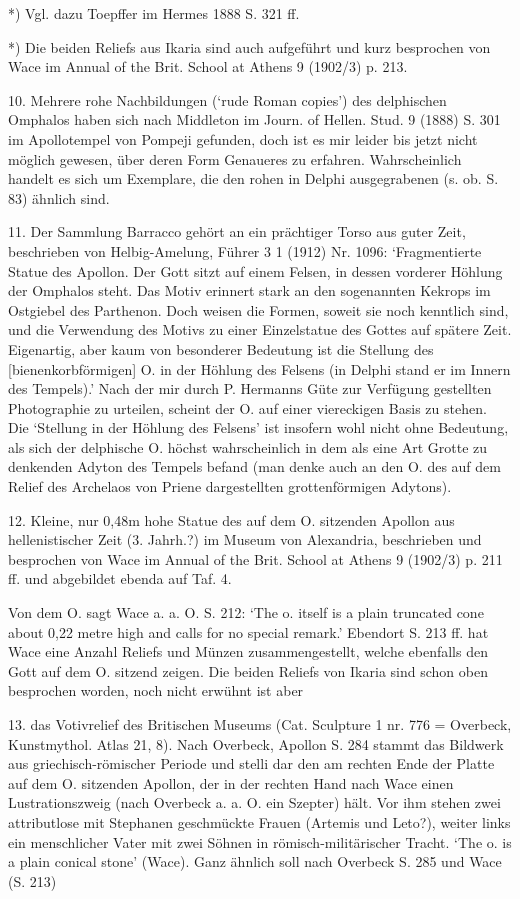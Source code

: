 \documentclass[a4paper, 11pt, oneside]{article}
\begin{document}
*) Vgl. dazu Toepffer im Hermes 1888 S. 321 ff.

*) Die beiden Reliefs aus Ikaria sind auch aufgeführt und kurz besprochen von Wace im Annual of the Brit. School at Athens 9 (1902/3) p. 213.

10. Mehrere rohe Nachbildungen (`rude Roman copies') des delphischen Omphalos haben sich nach Middleton im Journ. of Hellen. Stud. 9 (1888) S. 301 im Apollotempel von Pompeji gefunden, doch ist es mir leider bis jetzt nicht möglich gewesen, über deren Form Genaueres zu erfahren. Wahrscheinlich handelt es sich um Exemplare, die den rohen in Delphi ausgegrabenen (s. ob. S. 83) ähnlich sind.

11. Der Sammlung Barracco gehört an ein prächtiger Torso aus guter Zeit, beschrieben von Helbig-Amelung, Führer 3 1 (1912) Nr. 1096: `Fragmentierte Statue des Apollon. Der Gott sitzt auf einem Felsen, in dessen vorderer Höhlung der Omphalos steht. Das Motiv erinnert stark an den sogenannten Kekrops im Ostgiebel des Parthenon. Doch weisen die Formen, soweit sie noch kenntlich sind, und die Verwendung des Motivs zu einer Einzelstatue des Gottes auf spätere Zeit. Eigenartig, aber kaum von besonderer Bedeutung ist die Stellung des [bienenkorbförmigen] O. in der Höhlung des Felsens (in Delphi stand er im Innern des Tempels).' Nach der mir durch P. Hermanns Güte zur Verfügung gestellten Photographie zu urteilen, scheint der O. auf einer viereckigen Basis zu stehen. Die `Stellung in der Höhlung des Felsens' ist insofern wohl nicht ohne Bedeutung, als sich der delphische O. höchst wahrscheinlich in dem als eine Art Grotte zu denkenden Adyton des Tempels befand (man denke auch an den O. des auf dem Relief des Archelaos von Priene dargestellten grottenförmigen Adytons).

12. Kleine, nur 0,48m hohe Statue des auf dem O. sitzenden Apollon aus hellenistischer Zeit (3. Jahrh.?) im Museum von Alexandria, beschrieben und besprochen von Wace im Annual of the Brit. School at Athens 9 (1902/3) p. 211 ff. und abgebildet ebenda auf Taf. 4.

Von dem O. sagt Wace a. a. O. S. 212: `The o. itself is a plain truncated cone about 0,22 metre high and calls for no special remark.' Ebendort S. 213 ff. hat Wace eine Anzahl Reliefs und Münzen zusammengestellt, welche ebenfalls den Gott auf dem O. sitzend zeigen. Die beiden Reliefs von Ikaria sind schon oben besprochen worden, noch nicht erwühnt ist aber

13. das Votivrelief des Britischen Museums (Cat. Sculpture 1 nr. 776 = Overbeck, Kunstmythol. Atlas 21, 8). Nach Overbeck, Apollon S. 284 stammt das Bildwerk aus griechisch-römischer Periode und stelli dar den am rechten Ende der Platte auf dem O. sitzenden Apollon, der in der rechten Hand nach Wace einen Lustrationszweig (nach Overbeck a. a. O. ein Szepter) hält. Vor ihm stehen zwei attributlose mit Stephanen geschmückte Frauen (Artemis und Leto?), weiter links ein menschlicher Vater mit zwei Söhnen in römisch-militärischer Tracht. `The o. is a plain conical stone' (Wace). Ganz ähnlich soll nach Overbeck S. 285 und Wace (S. 213)
\end{document}
